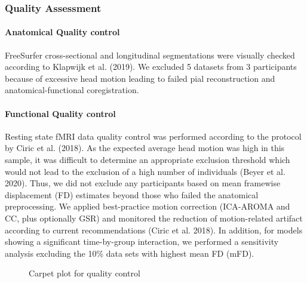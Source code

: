 \documentclass[
]{article}
\begin{document}
\hypertarget{quality-assessment}{%
\subsubsection{Quality Assessment}\label{quality-assessment}}

\hypertarget{anatomical-quality-control}{%
\paragraph{Anatomical Quality control}\label{anatomical-quality-control}}

FreeSurfer cross-sectional and longitudinal segmentations were visually checked according to Klapwijk et al. (2019). We excluded 5 datasets from 3 participants because of excessive head motion leading to failed pial reconstruction and anatomical-functional coregistration.

\hypertarget{functional-quality-control}{%
\paragraph{Functional Quality control}\label{functional-quality-control}}

Resting state fMRI data quality control was performed according to the protocol by Ciric et al. (2018).
As the expected average head motion was high in this sample, it was difficult to determine an appropriate exclusion threshold which would not lead to the exclusion of a high number of individuals (Beyer et al. 2020). Thus, we did not exclude any participants based on mean framewise displacement (FD) estimates beyond those who failed the anatomical preprocessing. We applied best-practice motion correction (ICA-AROMA and CC, plus optionally GSR) and monitored the reduction of motion-related artifact according to current recommendations (Ciric et al. 2018). In addition, for models showing a significant time-by-group interaction, we performed a sensitivity analysis excluding the 10\% data sets with highest mean FD (mFD).

\begin{figure}

{\centering {}

}

\caption{Carpet plot for quality control}\label{fig:carpetplot}
\end{figure}
\end{document}
